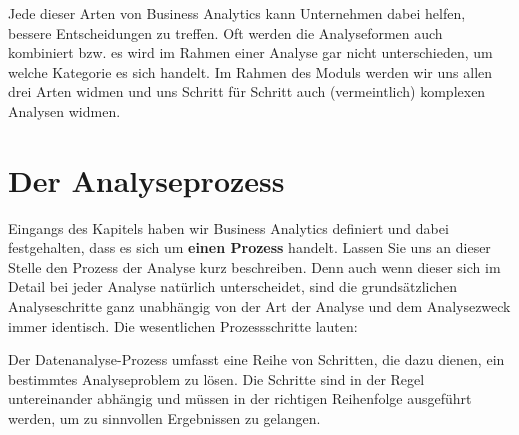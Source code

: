 \documentclass[
  letterpaper,
  DIV=11]{scrreprt}
\begin{document}
Jede dieser Arten von Business Analytics kann Unternehmen dabei helfen,
bessere Entscheidungen zu treffen. Oft werden die Analyseformen auch
kombiniert bzw. es wird im Rahmen einer Analyse gar nicht unterschieden,
um welche Kategorie es sich handelt. Im Rahmen des Moduls werden wir uns
allen drei Arten widmen und uns Schritt für Schritt auch (vermeintlich)
komplexen Analysen widmen.

\hypertarget{der-analyseprozess}{%
\section{Der Analyseprozess}\label{der-analyseprozess}}

Eingangs des Kapitels haben wir Business Analytics definiert und dabei
festgehalten, dass es sich um \textbf{einen Prozess} handelt. Lassen Sie
uns an dieser Stelle den Prozess der Analyse kurz beschreiben. Denn auch
wenn dieser sich im Detail bei jeder Analyse natürlich unterscheidet,
sind die grundsätzlichen Analyseschritte ganz unabhängig von der Art der
Analyse und dem Analysezweck immer identisch. Die wesentlichen
Prozessschritte lauten:

Der Datenanalyse-Prozess umfasst eine Reihe von Schritten, die dazu
dienen, ein bestimmtes Analyseproblem zu lösen. Die Schritte sind in der
Regel untereinander abhängig und müssen in der richtigen Reihenfolge
ausgeführt werden, um zu sinnvollen Ergebnissen zu gelangen.
\end{document}
